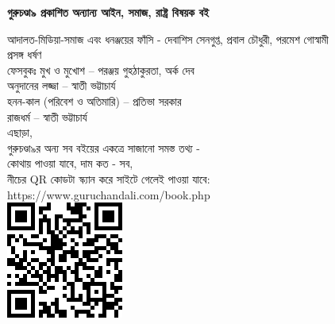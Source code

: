 \clearpage
\small
\centering
\textbf{গুরুচণ্ডা৯ প্রকাশিত অন্যান্য আইন, সমাজ, রাষ্ট্র বিষয়ক বই} \\
\raggedright
\scriptsize
আদালত-মিডিয়া-সমাজ এবং ধনঞ্জয়ের ফাঁসি - দেবাশিস সেনগুপ্ত, প্রবাল চৌধুরী, পরমেশ গোস্বামী \\
প্রসঙ্গ ধর্ষণ \\
ফেসবুকঃ মুখ ও মুখোশ – পরঞ্জয় গুহঠাকুরতা, অর্ক দেব \\
অনুদানের লজ্জা – স্বাতী ভট্টাচার্য \\
হনন-কাল (পরিবেশ ও অতিমারি) – প্রতিভা সরকার \\
রাজধর্ম – স্বাতী ভট্টাচার্য \\
\baselineskip
\raggedleft
\scriptsize
এছাড়া, \\
গুরুচণ্ডা৯র অন্য সব বইয়ের একত্রে সাজানো সমস্ত তথ্য - \\
কোথায় পাওয়া যাবে, দাম কত - সব, \\
নীচের QR কোডটা স্ক্যান করে সাইটে গেলেই পাওয়া যাবে: \\
https://www.guruchandali.com/book.php \\
\baselineskip
\includegraphics[scale=0.8]{Images/QRCode_2022.png}